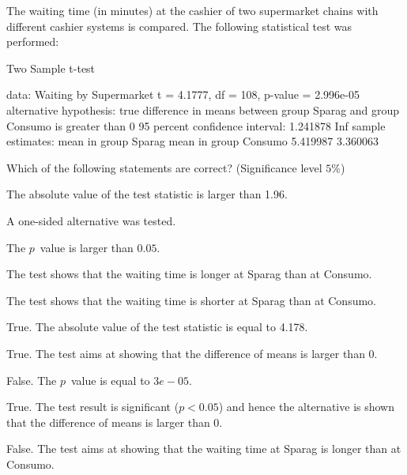 
\begin{question}
The waiting time (in minutes) at the cashier of two supermarket
chains with different cashier systems is compared. The following
statistical test was performed:

\begin{Schunk}
\begin{Soutput}
	Two Sample t-test

data:  Waiting by Supermarket
t = 4.1777, df = 108, p-value = 2.996e-05
alternative hypothesis: true difference in means between group Sparag and group Consumo is greater than 0
95 percent confidence interval:
 1.241878      Inf
sample estimates:
 mean in group Sparag mean in group Consumo 
             5.419987              3.360063 
\end{Soutput}
\end{Schunk}

Which of the following statements are correct? (Significance level $5\%$)

\begin{answerlist}
  \item The absolute value of the test statistic is larger than 1.96.
  \item A one-sided alternative was tested.
  \item The $p$~value is larger than $0.05$.
  \item The test shows that the waiting time is longer at Sparag  than at Consumo.
  \item The test shows that the waiting time is shorter at Sparag than at Consumo.
\end{answerlist}
\end{question}

\begin{solution}
\begin{answerlist}
  \item True. The absolute value of the test statistic is equal to 4.178.
  \item True. The test aims at showing that the difference of means is  larger than $0$.
  \item False. The $p$~value is equal to $3e-05$.
  \item True. The test result is significant ($p < 0.05$) and hence the alternative is shown that the difference of means is larger than 0.
  \item False. The test aims at showing that the waiting time at Sparag is longer than at Consumo. 
\end{answerlist}
\end{solution}


